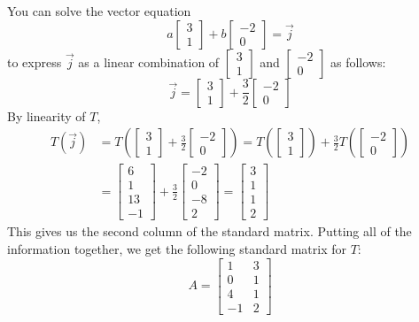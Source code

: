 \documentclass{ximera}
\begin{document}
\begin{example}
\begin{explanation}
You can solve the vector equation
$$a\begin{bmatrix}3\\1\end{bmatrix}+b\begin{bmatrix}-2\\0\end{bmatrix}=\vec{j}$$
to express $\vec{j}$ as a linear combination of $\begin{bmatrix}3\\1\end{bmatrix}$ and $\begin{bmatrix}-2\\0\end{bmatrix}$ as follows:
$$\vec{j}=\begin{bmatrix}3\\1\end{bmatrix}+\frac{3}{2}\begin{bmatrix}-2\\0\end{bmatrix}$$
By linearity of $T$,
\begin{align*}
    T(\vec{j})&=T\left(\begin{bmatrix}3\\1\end{bmatrix}+\frac{3}{2}\begin{bmatrix}-2\\0\end{bmatrix}\right)=T\left(\begin{bmatrix}3\\1\end{bmatrix}\right)+\frac{3}{2}T\left(\begin{bmatrix}-2\\0\end{bmatrix}\right)\\
    &=\begin{bmatrix}6\\1\\13\\-1\end{bmatrix}+\frac{3}{2}\begin{bmatrix}-2\\0\\-8\\2\end{bmatrix}=\begin{bmatrix}3\\1\\1\\2\end{bmatrix}
\end{align*}
This gives us the second column of the standard matrix.  Putting all of the information together, we get the following standard matrix for $T$:
$$A=\begin{bmatrix}1&3\\0&1\\4&1\\-1&2\end{bmatrix}$$
\end{explanation}
 \end{example}
\end{document}
